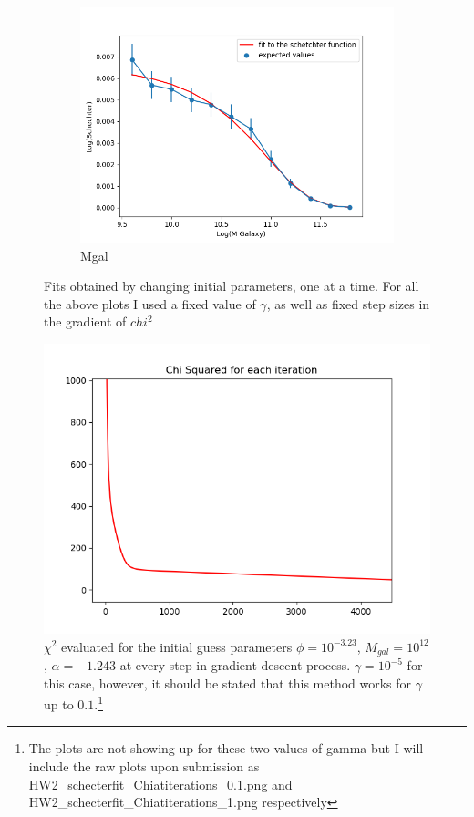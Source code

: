 \documentclass[12pt]{article}
\begin{document}
\begin{figure}
\begin{subfigure}[b]{0.4\textwidth}
        \includegraphics[width=\textwidth]{HW2_schecterfit_Mgal.png}
        \caption{Mgal}
        \label{fig:Mgal}
    \end{subfigure}
    \caption{Fits obtained by changing initial parameters, one at a time. For all the above plots I used a fixed value of $\gamma$, as well as fixed step sizes in the gradient of $chi^2$}\label{fig:animals}
\end{figure}

\begin{figure}
    \centering
    \includegraphics{HW2_schecterfit_Chiatiterations.png}
    \caption{$\chi^2$ evaluated for the initial guess parameters $\phi = 10^{-3.23}$, $M_{gal} = 10^{12}$, $\alpha = -1.243$ at every step in gradient descent process. $\gamma = 10^{-5}$ for this case, however, it should be stated that this method works for $\gamma$ up to $0.1$.\footnote{The plots are not showing up for these two values of gamma but I will include the raw plots upon submission as HW2_schecterfit_Chiatiterations_0.1.png and HW2_schecterfit_Chiatiterations_1.png respectively}}
    \label{fig:chi2}
\end{figure}{}
\end{document}
